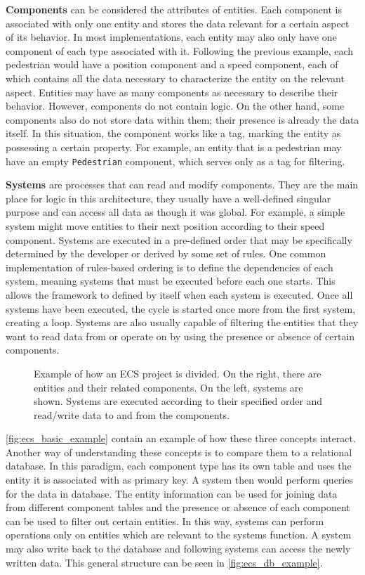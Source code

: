 \documentclass[twoside, 11pt]{article}
\begin{document}
\textbf{Components} can be considered the attributes of entities. Each component is associated with only one entity and stores the data relevant for a certain aspect of its behavior. In most implementations, each entity may also only have one component of each type associated with it. Following the previous example, each pedestrian would have a position component and a speed component, each of which contains all the data necessary to characterize the entity on the relevant aspect. Entities may have as many components as necessary to describe their behavior. However, components do not contain logic. On the other hand, some components also do not store data within them; their presence is already the data itself. In this situation, the component works like a tag, marking the entity as possessing a certain property. For example, an entity that is a pedestrian may have an empty \verb|Pedestrian| component, which serves only as a tag for filtering.

\textbf{Systems} are processes that can read and modify components. They are the main place for logic in this architecture, they usually have a well-defined singular purpose and can access all data as though it was global. For example, a simple system might move entities to their next position according to their speed component. Systems are executed in a pre-defined order that may be specifically determined by the developer or derived by some set of rules. One common implementation of rules-based ordering is to define the dependencies of each system, meaning systems that must be executed before each one starts. This allows the framework to defined by itself when each system is executed. Once all systems have been executed, the cycle is started once more from the first system, creating a loop. Systems are also usually capable of filtering the entities that they want to read data from or operate on by using the presence or absence of certain components.

\begin{figure}[h]
  \centering
  
  \caption{Example of how an ECS project is divided. On the right, there are entities and their related components. On the left, systems are shown. Systems are executed according to their specified order and read/write data to and from the components.}
  \label{fig:ecs_basic_example}
\end{figure}

\autoref{fig:ecs_basic_example} contain an example of how these three concepts interact.  Another way of understanding these concepts is to compare them to a relational database. In this paradigm, each component type has its own table and uses the entity it is associated with as primary key. A system then would perform queries for the data in database. The entity information can be used for joining data from different component tables and the presence or absence of each component can be used to filter out certain entities. In this way, systems can perform operations only on entities which are relevant to the systems function. A system may also write back to the database and following systems can access the newly written data. This general structure can be seen in \autoref{fig:ecs_db_example}.
\end{document}
